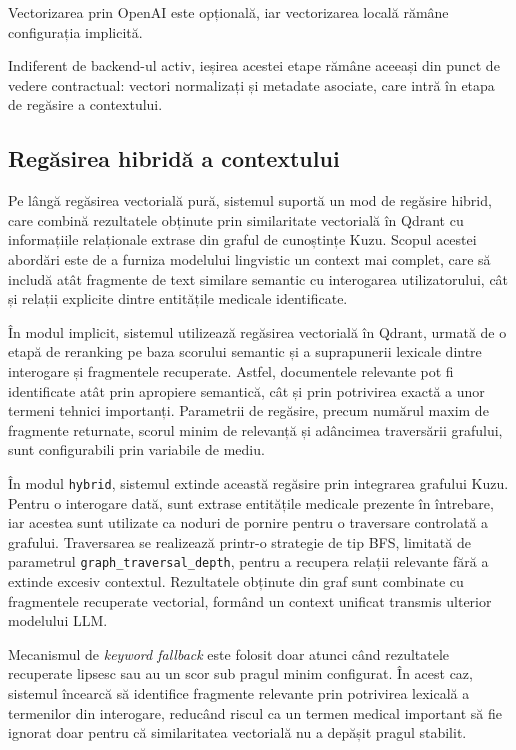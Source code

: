 \documentclass[12pt, a4paper, oneside, romanian]{teza-upb}
\begin{document}
Vectorizarea prin OpenAI este opțională, iar vectorizarea locală rămâne configurația implicită.

Indiferent de backend-ul activ, ieșirea acestei etape rămâne aceeași din punct de vedere contractual: vectori normalizați și metadate asociate, care intră în etapa de regăsire a contextului.


\subsection{Regăsirea hibridă a contextului}

Pe lângă regăsirea vectorială pură, sistemul suportă un mod de regăsire hibrid, care combină rezultatele obținute prin similaritate vectorială în Qdrant cu informațiile relaționale extrase din graful de cunoștințe Kuzu. Scopul acestei abordări este de a furniza modelului lingvistic un context mai complet, care să includă atât fragmente de text similare semantic cu interogarea utilizatorului, cât și relații explicite dintre entitățile medicale identificate.

În modul implicit, sistemul utilizează regăsirea vectorială în Qdrant, urmată de o etapă de reranking pe baza scorului semantic și a suprapunerii lexicale dintre interogare și fragmentele recuperate. Astfel, documentele relevante pot fi identificate atât prin apropiere semantică, cât și prin potrivirea exactă a unor termeni tehnici importanți. Parametrii de regăsire, precum numărul maxim de fragmente returnate, scorul minim de relevanță și adâncimea traversării grafului, sunt configurabili prin variabile de mediu.

În modul \texttt{hybrid}, sistemul extinde această regăsire prin integrarea grafului Kuzu. Pentru o interogare dată, sunt extrase entitățile medicale prezente în întrebare, iar acestea sunt utilizate ca noduri de pornire pentru o traversare controlată a grafului. Traversarea se realizează printr-o strategie de tip BFS, limitată de parametrul \texttt{graph\_traversal\_depth}, pentru a recupera relații relevante fără a extinde excesiv contextul. Rezultatele obținute din graf sunt combinate cu fragmentele recuperate vectorial, formând un context unificat transmis ulterior modelului LLM.

Mecanismul de \textit{keyword fallback} este folosit doar atunci când rezultatele recuperate lipsesc sau au un scor sub pragul minim configurat. În acest caz, sistemul încearcă să identifice fragmente relevante prin potrivirea lexicală a termenilor din interogare, reducând riscul ca un termen medical important să fie ignorat doar pentru că similaritatea vectorială nu a depășit pragul stabilit.
\end{document}
